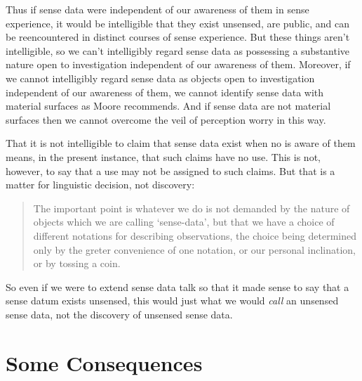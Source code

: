 \documentclass[11pt]{article}
\begin{document}
Thus if sense data were independent of our awareness of them in sense experience, it would be intelligible that they exist unsensed, are public, and can be reencountered in distinct courses of sense experience. But these things aren't intelligible, so we can't intelligibly regard sense data as possessing a substantive nature open to investigation independent of our awareness of them. Moreover, if we cannot intelligibly regard sense data as objects open to investigation independent of our awareness of them, we cannot identify sense data with material surfaces as Moore recommends. And if sense data are not material surfaces then we cannot overcome the veil of perception worry in this way.

That it is not intelligible to claim that sense data exist when no is aware of them means, in the present instance, that such claims have no use. This is not, however, to say that a use may not be assigned to such claims. But that is a matter for linguistic decision, not discovery:
\begin{quote}
    The important point is whatever we do is not demanded by the nature of objects which we are calling `sense-data', but that we have a choice of different notations for describing observations, the choice being determined only by the greter convenience of one notation, or our personal inclination, or by tossing a coin.
\end{quote}
So even if we were to extend sense data talk so that it made sense to say that a sense datum exists unsensed, this would just what we would \emph{call} an unsensed sense data, not the discovery of unsensed sense data.


\section{Some Consequences} %
\label{sec:some_consequences}
\end{document}
